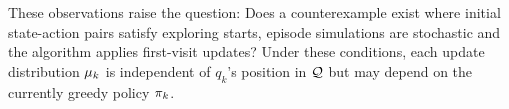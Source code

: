 These observations raise the question: Does a counterexample exist where
initial state-action pairs satisfy exploring starts, 
episode simulations are stochastic 
and the algorithm applies first-visit updates?
Under these conditions, each update distribution $\mu_k$ is independent of $q_k$'s position in $\mathcal{Q}$ but may depend on the currently greedy policy $\pi_k$.





